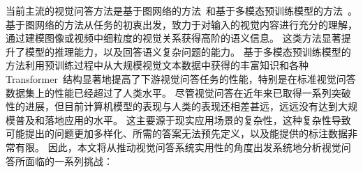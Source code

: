 

当前主流的视觉问答方法是基于图网络的方法~\cite{wu2018object,cadene2019murel,li2019relation,hu2019language,huang2020location,kim2020modality,wang2021dualvgr,seo2021attend,park2021bridge}和基于多模态预训练模型的方法~\cite{lu2019vilbert,su2019vl,li2019visualbert,chen2020uniter,tan2019lxmert,li2020oscar,cho2021unifying,jin2022good,jiang2022finetuning,zeng2022multi,li2022blip,wang2022ofa}。
基于图网络的方法从任务的初衷出发，致力于对输入的视觉内容进行充分的理解，通过建模图像或视频中细粒度的视觉关系获得高阶的语义信息。
这类方法显著提升了模型的推理能力，以及回答语义复杂问题的能力。
基于多模态预训练模型的方法利用预训练过程中从大规模视觉文本数据中获得的丰富知识和各种Transformer~\cite{vaswani2017attention}结构显著地提高了下游视觉问答任务的性能，特别是在标准视觉问答数据集上的性能已经超过了人类水平。
尽管视觉问答在近年来已取得一系列突破性的进展，但目前计算机模型的表现与人类的表现还相差甚远，远远没有达到大规模普及和落地应用的水平。
这主要源于现实应用场景的复杂性，这种复杂性导致可能提出的问题更加多样化、所需的答案无法预先定义，以及能提供的标注数据非常有限。
因此，本文将从推动视觉问答系统实用性的角度出发系统地分析视觉问答所面临的一系列挑战：


